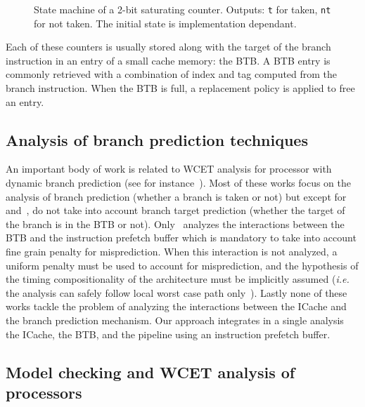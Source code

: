 \begin{figure}
    \centering
    \begin{adjustbox}{width=\textwidth}
        
    \end{adjustbox}
    \caption{State machine of a 2-bit saturating counter. Outputs: \texttt{t} for taken, \texttt{nt} for not taken. The initial state is implementation dependant.}
    \label{fig:sat_counter}
\end{figure}

Each of these counters is usually stored along with the target of the branch instruction in an entry of a small cache memory: the BTB. A BTB entry is commonly retrieved with a combination of index and tag computed from the branch instruction.
When the BTB is full, a replacement policy is applied to free an entry.

\subsection{Analysis of branch prediction techniques}

An important body of work is related to WCET analysis for processor with dynamic branch prediction (see for instance~\cite{Colin2000,Bate2004,Maiza2011,Grund2011625,Puffitsch2016}).
Most of these works focus on the analysis of branch prediction (whether a branch is taken or not) but except for~\cite{Colin2000} and~\cite{Grund2011625}, do not take into account branch target prediction (whether the target of the branch is in the BTB or not).
Only~\cite{Grund2011625} analyzes the interactions between the BTB and the instruction prefetch buffer which is mandatory to take into account fine grain penalty for misprediction.
When this interaction is not analyzed, a uniform penalty must be used to account for misprediction, and the hypothesis of the timing compositionality of the architecture must be implicitly assumed (\textsl{i.e.} the analysis can safely follow local worst case path only~\cite{Wilhelm2009}).  
Lastly none of these works tackle the problem of analyzing the interactions between the ICache and the branch prediction mechanism.
Our approach integrates in a single analysis the ICache, the BTB, and the pipeline using an instruction prefetch buffer. 

\subsection{Model checking and WCET analysis of processors}

